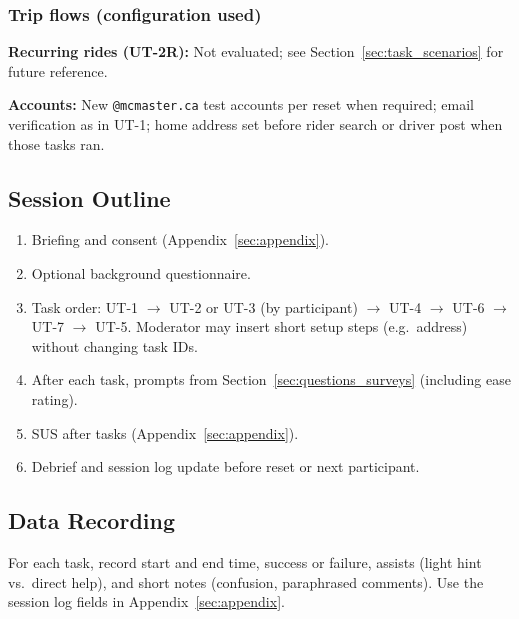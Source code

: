 \subsubsection{Trip flows (configuration used)}

\noindent\textbf{Recurring rides (UT-2R):} Not evaluated; see Section~\ref{sec:task_scenarios} for future reference.

\noindent\textbf{Accounts:} New \texttt{@mcmaster.ca} test accounts per reset when required; email verification as in UT-1; home address set before rider search or driver post when those tasks ran.

\subsection{Session Outline}

\begin{enumerate}
  \item Briefing and consent (Appendix~\ref{sec:appendix}).
  \item Optional background questionnaire.
  \item Task order: UT-1 $\rightarrow$ UT-2 or UT-3 (by participant) $\rightarrow$ UT-4 $\rightarrow$ UT-6 $\rightarrow$ UT-7 $\rightarrow$ UT-5. Moderator may insert short setup steps (e.g.\ address) without changing task IDs.
  \item After each task, prompts from Section~\ref{sec:questions_surveys} (including ease rating).
  \item SUS after tasks (Appendix~\ref{sec:appendix}).
  \item Debrief and session log update before reset or next participant.
\end{enumerate}

\subsection{Data Recording}

For each task, record start and end time, success or failure, assists (light hint vs.\ direct help), and short notes (confusion, paraphrased comments). Use the session log fields in Appendix~\ref{sec:appendix}.
